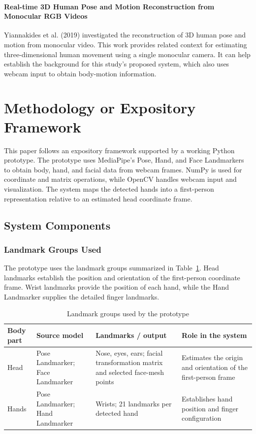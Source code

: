 \documentclass[12pt,a4paper]{article}
\begin{document}
        \paragraph{Real-time 3D Human Pose and Motion Reconstruction from Monocular RGB Videos}
        Yiannakides et al. (2019) investigated the reconstruction of 3D human pose and motion from monocular video. This work provides related context for estimating three-dimensional human movement using a single monocular camera. It can help establish the background for this study's proposed system, which also uses webcam input to obtain body-motion information.


\section{Methodology or Expository Framework}

This paper follows an expository framework supported by a working Python prototype. The prototype uses MediaPipe's Pose, Hand, and Face Landmarkers to obtain body, hand, and facial data from webcam frames. NumPy is used for coordinate and matrix operations, while OpenCV handles webcam input and visualization. The system maps the detected hands into a first-person representation relative to an estimated head coordinate frame.

\subsection{System Components}

\subsubsection{Landmark Groups Used}

The prototype uses the landmark groups summarized in Table~\ref{tab:landmarks}. Head landmarks establish the position and orientation of the first-person coordinate frame. Wrist landmarks provide the position of each hand, while the Hand Landmarker supplies the detailed finger landmarks.

\begin{table}[h!]
    \centering
    \caption{Landmark groups used by the prototype}
    \label{tab:landmarks}
    \small
    \begin{tabular}{>{\raggedright\arraybackslash}p{2.2cm} >{\raggedright\arraybackslash}p{3.6cm} >{\raggedright\arraybackslash}p{3.4cm} >{\raggedright\arraybackslash}p{4.6cm}}
        \toprule
        Body part & Source model & Landmarks / output & Role in the system \\
        \midrule
        Head & Pose Landmarker; Face Landmarker & Nose, eyes, ears; facial transformation matrix and selected face-mesh points & Estimates the origin and orientation of the first-person frame \\
        Hands & Pose Landmarker; Hand Landmarker & Wrists; 21 landmarks per detected hand & Establishes hand position and finger configuration \\
        \bottomrule
    \end{tabular}
\end{table}
\end{document}
